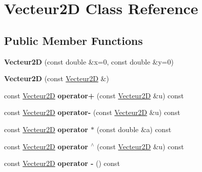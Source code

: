 \hypertarget{class_vecteur2_d}{}\section{Vecteur2D Class Reference}
\label{class_vecteur2_d}
\subsection*{Public Member Functions}
\begin{DoxyCompactItemize}
\item 
\mbox{\label{class_vecteur2_d_ad9dee29de356e9bd4bee597dddf431b0}} 
{\bfseries Vecteur2D} (const double \&x=0, const double \&y=0)
\item 
\mbox{\label{class_vecteur2_d_ac84370be972d55236f7d973745142270}} 
{\bfseries Vecteur2D} (const \mbox{\hyperlink{class_vecteur2_d}{Vecteur2D}} \&)
\item 
\mbox{\label{class_vecteur2_d_aaed6615f626d64f66d77e17dfdb8c2f0}} 
const \mbox{\hyperlink{class_vecteur2_d}{Vecteur2D}} {\bfseries operator+} (const \mbox{\hyperlink{class_vecteur2_d}{Vecteur2D}} \&u) const
\item 
\mbox{\label{class_vecteur2_d_aabcc1bee7830f4ee6397af8cffafb7fa}} 
const \mbox{\hyperlink{class_vecteur2_d}{Vecteur2D}} {\bfseries operator-\/} (const \mbox{\hyperlink{class_vecteur2_d}{Vecteur2D}} \&u) const
\item 
\mbox{\label{class_vecteur2_d_aaca13009f4c8bd1d4707e80a0ba83380}} 
const \mbox{\hyperlink{class_vecteur2_d}{Vecteur2D}} {\bfseries operator $\ast$} (const double \&a) const
\item 
\mbox{\label{class_vecteur2_d_acb66d0a40ff928d07898b2df0735ef6a}} 
const \mbox{\hyperlink{class_vecteur2_d}{Vecteur2D}} {\bfseries operator $^\wedge$} (const \mbox{\hyperlink{class_vecteur2_d}{Vecteur2D}} \&u) const
\item 
\mbox{\label{class_vecteur2_d_ad66f16f464a7c1b7a92cff4d8414b9d6}} 
const \mbox{\hyperlink{class_vecteur2_d}{Vecteur2D}} {\bfseries operator -\/} () const
\item 

\end{DoxyCompactItemize}
